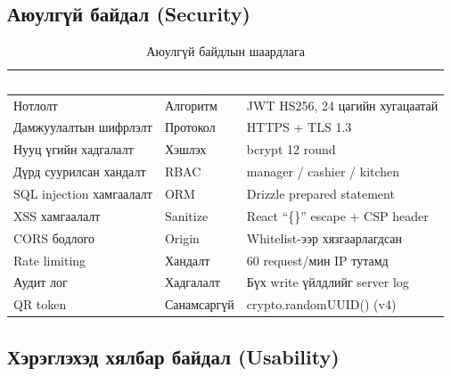 \subsection{Аюулгүй байдал (Security)}

\begin{table}[htbp]
\caption{Аюулгүй байдлын шаардлага}
\label{tab:nfr_security}
\centering
\small
\begin{tabularx}{\textwidth}{|L|L|Y|}
\hline
{}
\textcolor{white}{\textbf{Шаардлага}} &
\textcolor{white}{\textbf{Хэмжүүр}} &
\textcolor{white}{\textbf{Заалт}} \\ \hline
Нотлолт & Алгоритм & JWT HS256, 24 цагийн хугацаатай \\ \hline
{}
Дамжуулалтын шифрлэлт & Протокол & HTTPS + TLS 1.3 \\ \hline
Нууц үгийн хадгалалт & Хэшлэх & bcrypt 12 round \\ \hline
{}
Дүрд суурилсан хандалт & RBAC & manager / cashier / kitchen \\ \hline
SQL injection хамгаалалт & ORM & Drizzle prepared statement \\ \hline
{}
XSS хамгаалалт & Sanitize & React ``\{\}'' escape + CSP header \\ \hline
CORS бодлого & Origin & Whitelist-ээр хязгаарлагдсан \\ \hline
{}
Rate limiting & Хандалт & 60 request/мин IP тутамд \\ \hline
Аудит лог & Хадгалалт & Бүх write үйлдлийг server log \\ \hline
{}
QR token & Санамсаргүй & crypto.randomUUID() (v4) \\ \hline
\end{tabularx}
\end{table}

\subsection{Хэрэглэхэд хялбар байдал (Usability)}

